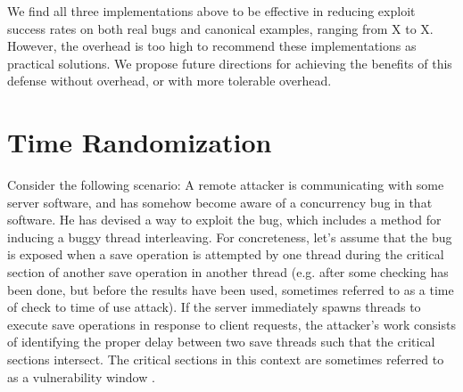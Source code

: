 \documentclass[letterpaper,twocolumn,10pt]{article}
\begin{document}
We find all three implementations above to be effective in reducing exploit success rates on both real bugs and canonical examples, ranging from X to X.  However, the overhead is too high to recommend these implementations as practical solutions.  We propose future directions for achieving the benefits of this defense without overhead, or with more tolerable overhead.

\section{Time Randomization}
Consider the following scenario: A remote attacker is communicating with some server software, and has somehow become aware of a concurrency bug in that software.  He has devised a way to exploit the bug, which includes a method for inducing a buggy thread interleaving.  For concreteness, let's assume that the bug is exposed when a save operation is attempted by one thread during the critical section of another save operation in another thread (e.g. after some checking has been done, but before the results have been used, sometimes referred to as a time of check to time of use attack).  If the server immediately spawns threads to execute save operations in response to client requests, the attacker's work consists of identifying the proper delay between two save threads such that the critical sections intersect.  The critical sections in this context are sometimes referred to as a vulnerability window \cite{Yang2012}.
\end{document}
